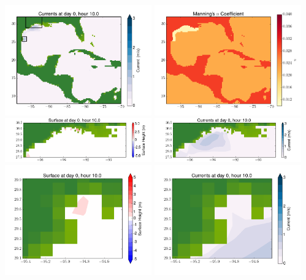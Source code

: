 \documentclass[11pt]{article}
\begin{document}
\includegraphics[width=0.475\textwidth]{frame0082fig2.png}
\vskip 10pt 
\includegraphics[width=0.475\textwidth]{frame0082fig3.png}
\includegraphics[width=0.475\textwidth]{frame0082fig4.png}
\vskip 10pt 
\includegraphics[width=0.475\textwidth]{frame0082fig5.png}
\includegraphics[width=0.475\textwidth]{frame0082fig6.png}
\vskip 10pt 
\includegraphics[width=0.475\textwidth]{frame0082fig7.png}
\end{document}
